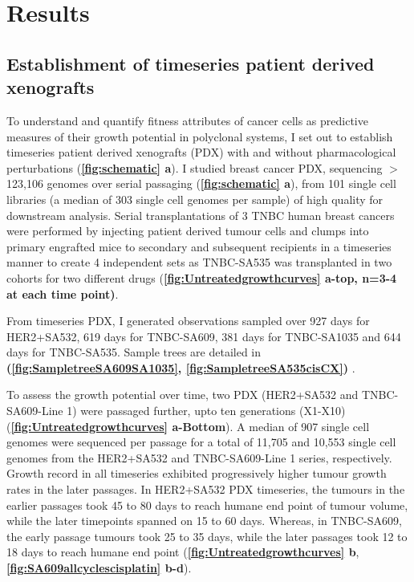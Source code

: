 \section{Results}

\subsection{Establishment of timeseries patient derived xenografts}

To understand and quantify fitness attributes of cancer cells as  predictive measures of their growth potential in polyclonal systems, I set out to establish timeseries patient derived xenografts (PDX) with and without pharmacological perturbations (\textbf{\autoref{fig:schematic} a}). I studied breast cancer PDX, sequencing $>$123,106 genomes over serial passaging (\textbf{\autoref{fig:schematic} a}), from 101 single cell libraries (a median of 303 single cell genomes per sample) of high quality for downstream analysis. 
Serial transplantations of 3 TNBC human breast cancers were performed by injecting patient derived tumour cells and clumps into primary engrafted mice to secondary and subsequent recipients in a timeseries manner to create 4 independent sets as TNBC-SA535 was transplanted in two cohorts for two different drugs (\textbf{\autoref{fig:Untreatedgrowthcurves} a-top, n=3-4 at each time point)}. 

From timeseries PDX, I generated observations sampled over 927 days for HER2+SA532, 619 days for TNBC-SA609, 381 days for TNBC-SA1035 and 644 days for TNBC-SA535. Sample trees are detailed in \textbf{(\autoref{fig:SampletreeSA609SA1035}, \autoref{fig:SampletreeSA535cisCX}) }.


To assess the growth potential over time, two PDX (HER2+SA532 and TNBC-SA609-Line 1) were passaged further, upto ten generations (X1-X10)
 (\textbf{\autoref{fig:Untreatedgrowthcurves} a-Bottom}).
 A median of 907 single cell genomes were sequenced per passage for a total of 11,705 and 10,553 single cell genomes from the HER2+SA532 and TNBC-SA609-Line 1 series, respectively. 
Growth record in all timeseries exhibited progressively higher tumour growth rates in the later passages. In HER2+SA532 PDX timeseries, the tumours in the earlier passages took 45 to 80 days to reach humane end point of tumour volume, while the later timepoints spanned on 15 to 60 days. Whereas, in TNBC-SA609, the early passage tumours took 25 to 35 days, while the later passages took 12 to 18 days to reach humane end point (\textbf{\autoref{fig:Untreatedgrowthcurves} b}, \textbf{\autoref{fig:SA609allcyclescisplatin} b-d}).

